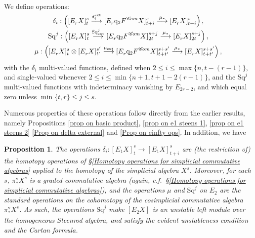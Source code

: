 \documentclass[11pt]{amsart} \renewcommand{\baselinestretch}{1.2}
\theoremstyle{plain}
\newtheorem{prop}[thm]{Proposition}
\numberwithin{equation}{section} %
\theoremstyle{plain}
\newtheorem{prop}[thm]{Proposition}
\numberwithin{equation}{chapter} %
\renewcommand{\to}{\longrightarrow}
\newcommand{\scrC}{\mathscr{C}}
\newcommand{\quadgrad}[1]{\mathrm{q}_{#1}}
\newcommand{\Sq}{\mathrm{Sq}}
\newcommand{\algs}{{\scrC\!\textit{\normalfont\textit{om}}}}
\newcommand{\Edownup}[5]{[E_{#1}^{#2}#3]^{#4}_{#5}}
\newcommand{\uver}{^\mathrm{v}}
\begin{document}
\begin{second quadrant homotopy sseq operations}
We define operations:
\begin{gather*}
\delta_i:\left(\Edownup{r}{}{X}{s}{t} \smash{{}\overset{\delta_i^\textup{ext}}{\to}{}} \Edownup{r}{}{\quadgrad{2}F^\algs X}{s}{t+i}\overset{\mu_*}{\to} 
\Edownup{r}{}{X}{s}{t+i}\right),
\\
\Sq^j:\left(\Edownup{r}{}{X}{s}{t}   \smash{{}\overset{\Sq^j_\textup{ext}}{\to}{}} \Edownup{r}{}{\quadgrad{2}F^\algs X}{s+j}{2t}\overset{\mu_*}{\to} 
\Edownup{r}{}{X}{s+j}{2t}\right),\\
\mu:\left(\Edownup{r}{}{X}{s}{t}\otimes \Edownup{r}{}{X}{s'}{t'}\smash{{}\overset{\mu_\textup{ext}}{\to}{}} \Edownup{r}{}{\quadgrad{2}F^\algs X}{s+s'}{t+t'}\overset{\mu_*}{\to} 
\Edownup{r}{}{X}{s+s'}{t+t'}\right),
\end{gather*}
with the $\delta_i$  multi-valued functions,  defined when $2\leq i\leq \max\{n,t-(r-1)\}$, and single-valued whenever $2\leq i\leq\min\{n+1,t+1-2(r-1)\}$, and the $\Sq^j$  multi-valued functions with indeterminacy vanishing by $E_{2r-2}$, and which equal zero unless $\min\{t,r\}\leq j\leq s$. 


Numerous properties of these operations follow directly from the earlier results, namely Propositions \ref{prop on basic product}, \ref{prop on e1 steens 1}, \ref{prop on e1 steens 2} \ref{Prop on delta external} and \ref{Prop on einfty ops}. In addition, we have



\begin{prop}
\label{final generic prop for basic sseq ops}
The operations $\delta_i:\Edownup{1}{}{X}{s}{t}\to \Edownup{1}{}{X}{s}{t+i}$
are (the restriction of) the homotopy operations of \S\ref{Homotopy operations for simplicial commutative algebras} applied to the homotopy of the simplicial algebra $X^{s}$. Moreover, for each $s$, $\pi\uver_*X^s$ is a graded commutative algebra (again, c.f.\ \S\ref{Homotopy operations for simplicial commutative algebras}), and the operations $\mu$ and $\Sq^j$ on $E_2$ are the standard operations on the cohomotopy of the cosimplicial commutative algebra $\pi\uver_*X^s$. As such, the operations $\Sq^j$ make $\Edownup{2}{}{X}{}{}$ is an unstable left module over the homogeneous Steenrod algebra, and satisfy the evident unstableness condition and the Cartan formula.


\end{prop}
\end{second quadrant homotopy sseq operations}
\end{document}

